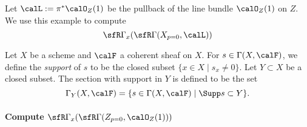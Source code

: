     Let \(\calL := \pi^* \calO_Z(1)\) be the pullback of the line bundle \(\calO_Z(1)\) on \(Z\).
    We use this example to compute 
    \[ \sfR \Gamma_x(\sfR \Gamma(X_{p=0}, \calL)) \]


    \begin{definition}
        Let \(X\) be a scheme and \(\calF\) a coherent sheaf on \(X\).
        For \(s \in \Gamma(X,\calF)\), we define the \emph{support} of \(s\) to be the closed subset \(\{x \in X \mid s_x \neq 0\}\).
        Let \(Y \subset X\) be a closed subset.
        The section with support in \(Y\) is defined to be the set
        \[ \Gamma_Y(X,\calF) = \{ s \in \Gamma(X,\calF) \mid \Supp s \subset Y \}. \]
    \end{definition}

    \paragraph{Compute \(\sfR \Gamma_x(\sfR \Gamma(Z_{p=0}, \calO_Z(1)))\)}

    

